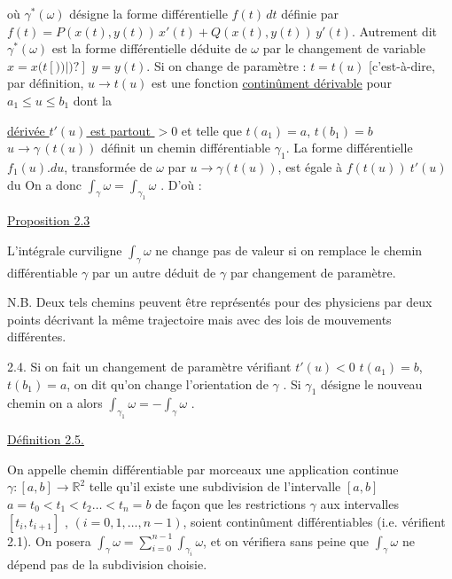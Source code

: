 \documentclass[11pt]{article}
\newcommand{\scanpage}[1]{\par\bigskip\noindent{\small\sffamily[scan #1]}\par}
\newcommand{\mspage}[1]{{\small\sffamily[p.\,#1]}}
\newcommand{\uline}[1]{\underline{#1}}
\newcommand{\unsure}[1]{[#1?]}
\begin{document}
où $\gamma^*(\omega)$ désigne la forme différentielle $f(t)\,dt$ définie par
$f(t) = P(x(t), y(t))\, x'(t) + Q(x(t), y(t))\, y'(t)$. Autrement dit $\gamma^*(\omega)$ est
la forme différentielle déduite de $\omega$ par le changement de variable $x = x(t\unsure{))|)}$
$y = y(t)$. Si on change de paramètre : $t = t(u)$ [c'est-à-dire, par définition,
$u \to t(u)$ est une fonction \uline{continûment dérivable} pour $a_1 \leq u \leq b_1$ dont la

\mspage{164}

\clearpage
\scanpage{119/165}
\mspage{- 4 -}

\uline{dérivée $t'(u)$ est partout $> 0$} et telle que $t(a_1) = a$, $t(b_1) = b$
$u \to \gamma\,(t(u))$ définit un chemin différentiable $\gamma_1$. La forme différentielle
$f_1(u).du$, transformée de $\omega$ par $u \to \gamma(t(u))$, est égale à $f(t(u))\ t'(u)$ du
On a donc $\int_\gamma \omega = \int_{\gamma_1} \omega$ . D'où :

\uline{Proposition 2.3}

L'intégrale curviligne $\int_\gamma \omega$ ne change pas de valeur si on remplace
le chemin différentiable $\gamma$ par un autre déduit de $\gamma$ par changement de
paramètre.

N.B. Deux tels chemins peuvent être représentés pour des physiciens par deux
points décrivant la même trajectoire mais avec des lois de mouvements différentes.

2.4. Si on fait un changement de paramètre vérifiant $t'(u) < 0$
$t(a_1) = b$, $t(b_1) = a$, on dit qu'on change l'orientation de $\gamma$ . Si $\gamma_1$
désigne le nouveau chemin on a alors $\int_{\gamma_1} \omega = - \int_\gamma \omega$ .

\uline{Définition 2.5.}

On appelle chemin différentiable par morceaux une application
continue $\gamma : [a,b] \to \mathbb{R}^2$ telle qu'il existe une subdivision de l'intervalle
$[a,b]$ $a = t_0 < t_1 < t_2 \dots < t_n = b$ de façon que les restrictions $\gamma$ aux
intervalles $[t_i, t_{i+1}]$ , $(i = 0,1,\dots,n-1)$, soient continûment différentiables
(i.e. vérifient 2.1).
On posera $\int_\gamma \omega = \sum_{i=0}^{n-1} \int_{\gamma_i} \omega$, et on vérifiera sans peine que $\int_\gamma \omega$ ne dépend
pas de la subdivision choisie.
\end{document}
